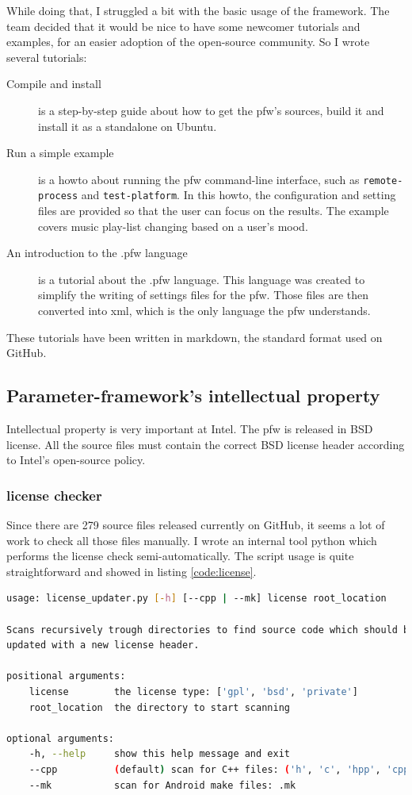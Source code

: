 While doing that, I struggled a bit with the basic usage of the framework. The
team decided that it would be nice to have some newcomer tutorials and examples,
for an easier adoption of the open-source community. So I wrote several
tutorials:
\begin{description}
    \item[Compile and install]
        is a step-by-step guide about how to get the \gls{pfw}'s sources,
        build it and install it as a standalone on Ubuntu.
    \item[Run a simple example]
        is a howto about running the \gls{pfw} command-line interface,
        such as \lstinline{remote-process} and \lstinline {test-platform}.  In
        this howto, the configuration and setting files are provided so that
        the user can focus on the results. The example covers music play-list
        changing based on a user's mood.
    \item[An introduction to the .pfw language]\label{desc:pfw-language}
        is a tutorial about the .pfw language. This language was
        created to simplify the writing of settings files for the
        \gls{pfw}. Those files are then converted into \gls{xml}, which is
        the only language the \gls{pfw} understands.
\end{description}
These tutorials have been written in \gls{markdown}, the standard format used
on GitHub.

\subsection{Parameter-framework's intellectual property}
Intellectual property is very important at Intel. The \gls{pfw} is released in
BSD license. All the source files must contain the correct BSD license header according
to Intel's open-source policy.

\subsubsection{license checker}
Since there are 279 source files released currently on GitHub, it seems a lot of
work to check all those files manually.
I wrote an internal tool \gls{python} which performs the license check semi-automatically.
The script usage is quite straightforward and showed in listing \ref{code:license}.

\begin{lstlisting}[language=bash, caption=License checker usage, label=code:license]
usage: license_updater.py [-h] [--cpp | --mk] license root_location

Scans recursively trough directories to find source code which should be
updated with a new license header.

positional arguments:
    license        the license type: ['gpl', 'bsd', 'private']
    root_location  the directory to start scanning

optional arguments:
    -h, --help     show this help message and exit
    --cpp          (default) scan for C++ files: ('h', 'c', 'hpp', 'cpp')
    --mk           scan for Android make files: .mk
\end{lstlisting}


